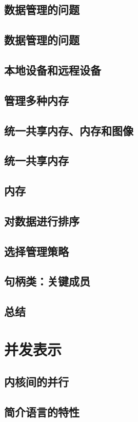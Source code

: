 \documentclass[11pt,a4paper,UTF8]{ctexart}
\begin{document}
		\subsection{数据管理的问题}
		\subsection{数据管理的问题}
		\subsection{本地设备和远程设备}
		\subsection{管理多种内存}
		\subsection{统一共享内存、内存和图像}
		\subsection{统一共享内存}
		\subsection{内存}
		\subsection{对数据进行排序}
		\subsection{选择管理策略}
		\subsection{句柄类：关键成员}
		\subsection{总结}
	\section{并发表示}
		\subsection{内核间的并行}
		\subsection{简介语言的特性}
\end{document}
